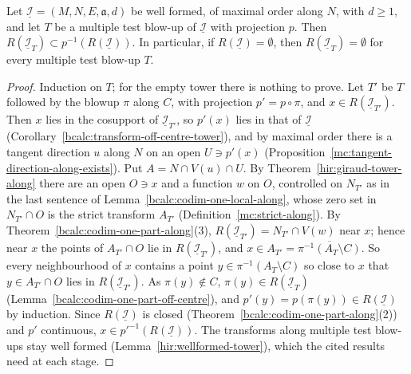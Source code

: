 \begin{theorem}
\label{bcalc:codim-one-part-tower}
\mixedleanok
Let \(\underline{\mathcal I}=(M,N,E,\mathfrak a,d)\) be well formed, of maximal order along \(N\), with \(d\ge1\), and let \(T\) be a multiple test blow-up of
\(\underline{\mathcal I}\) with projection \(p\). Then \(R(\underline{\mathcal I}_T)\subset p^{-1}(R(\underline{\mathcal I}))\). In particular, if \(R(\underline{\mathcal I})=\emptyset\),
then \(R(\underline{\mathcal I}_T)=\emptyset\) for every multiple test blow-up \(T\).
\end{theorem}
\begin{proof}
\mixedleanok
Induction on \(T\); for the empty tower there is nothing to prove. Let \(T'\) be \(T\) followed by the blowup \(\pi\) along \(C\), with projection \(p'=p\circ\pi\),
and \(x\in R(\underline{\mathcal I}_{T'})\). Then \(x\) lies in the cosupport of \(\underline{\mathcal I}_{T'}\), so \(p'(x)\) lies in that of \(\underline{\mathcal I}\)
(Corollary~\ref{bcalc:transform-off-centre-tower}), and by maximal order there is a tangent direction \(u\) along \(N\) on an open \(U\ni p'(x)\)
(Proposition~\ref{mc:tangent-direction-along-exists}). Put \(A=N\cap V(u)\cap U\). By Theorem~\ref{hir:giraud-tower-along} there are an open \(O\ni x\) and a function \(w\)
on \(O\), controlled on \(N_{T'}\) as in the last sentence of Lemma~\ref{bcalc:codim-one-local-along}, whose zero set in \(N_{T'}\cap O\) is the strict transform
\(A_{T'}\) (Definition~\ref{mc:strict-along}). By Theorem~\ref{bcalc:codim-one-part-along}(3), \(R(\underline{\mathcal I}_{T'})=N_{T'}\cap V(w)\) near \(x\); hence near \(x\)
the points of \(A_{T'}\cap O\) lie in \(R(\underline{\mathcal I}_{T'})\), and \(x\in A_{T'}=\overline{\pi^{-1}(A_T\setminus C)}\). So every neighbourhood of \(x\) contains a point
\(y\in\pi^{-1}(A_T\setminus C)\) so close to \(x\) that \(y\in A_{T'}\cap O\) lies in \(R(\underline{\mathcal I}_{T'})\). As \(\pi(y)\notin C\), \(\pi(y)\in R(\underline{\mathcal I}_T)\)
(Lemma~\ref{bcalc:codim-one-part-off-centre}), and \(p'(y)=p(\pi(y))\in R(\underline{\mathcal I})\) by induction. Since \(R(\underline{\mathcal I})\) is closed
(Theorem~\ref{bcalc:codim-one-part-along}(2)) and \(p'\) continuous, \(x\in p'^{-1}(R(\underline{\mathcal I}))\). The transforms along multiple test blow-ups stay well
formed (Lemma~\ref{hir:wellformed-tower}), which the cited results need at each stage.
\end{proof}

